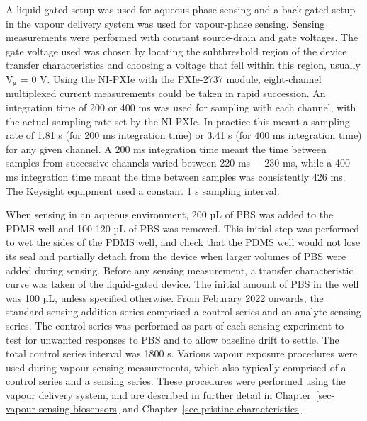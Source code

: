 \documentclass[
  a4paper,
]{scrbook}
\begin{document}
A liquid-gated setup was used for aqueous-phase sensing and a back-gated
setup in the vapour delivery system was used for vapour-phase sensing.
Sensing measurements were performed with constant source-drain and gate
voltages. The gate voltage used was chosen by locating the subthreshold
region of the device transfer characteristics and choosing a voltage
that fell within this region, usually V\(_{\mathrm{g}}\) = 0 V. Using
the NI-PXIe with the PXIe-2737 module, eight-channel multiplexed current
measurements could be taken in rapid succession. An integration time of
200 or 400 ms was used for sampling with each channel, with the actual
sampling rate set by the NI-PXIe. In practice this meant a sampling rate
of 1.81 s (for 200 ms integration time) or 3.41 s (for 400 ms
integration time) for any given channel. A 200 ms integration time meant
the time between samples from successive channels varied between 220 ms
\(-\) 230 ms, while a 400 ms integration time meant the time between
samples was consistently 426 ms. The Keysight equipment used a constant
1 s sampling interval.

When sensing in an aqueous environment, 200 µL of PBS was added to the
PDMS well and 100-120 µL of PBS was removed. This initial step was
performed to wet the sides of the PDMS well, and check that the PDMS
well would not lose its seal and partially detach from the device when
larger volumes of PBS were added during sensing. Before any sensing
measurement, a transfer characteristic curve was taken of the
liquid-gated device. The initial amount of PBS in the well was 100 µL,
unless specified otherwise. From Feburary 2022 onwards, the standard
sensing addition series comprised a control series and an analyte
sensing series. The control series was performed as part of each sensing
experiment to test for unwanted responses to PBS and to allow baseline
drift to settle. The total control series interval was 1800 s. Various
vapour exposure procedures were used during vapour sensing measurements,
which also typically comprised of a control series and a sensing series.
These procedures were performed using the vapour delivery system, and
are described in further detail in
Chapter~\ref{sec-vapour-sensing-biosensors} and
Chapter~\ref{sec-pristine-characteristics}.
\end{document}
